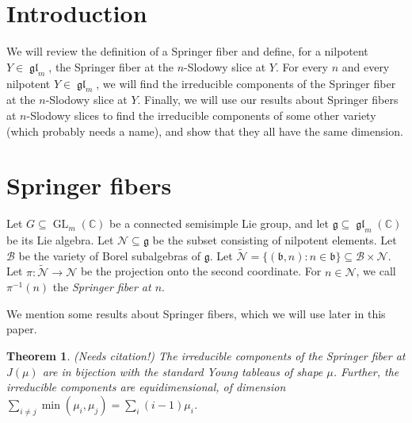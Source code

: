 \documentclass[12pt,psamsfonts]{article}
\DeclareMathOperator{\GL}{GL}
\DeclareMathOperator{\gl}{\mathfrak{gl}}
\newtheorem{theorem}{Theorem}[section]
\begin{document}

\section{Introduction}
We will review the definition of a Springer fiber and define, for a nilpotent \(Y \in \gl_m\), the Springer fiber at the \(n\)-Slodowy slice at \(Y\).
For every \(n\) and every nilpotent \(Y \in \gl_m\), we will find the irreducible components of the Springer fiber at the \(n\)-Slodowy slice at \(Y\).
Finally, we will use our results about Springer fibers at \(n\)-Slodowy slices to find the irreducible components of some other variety (which probably needs a name), and show that they all have the same dimension.

\section{Springer fibers}
Let \(G \subseteq \GL_m(\mathbb{C})\) be a connected semisimple Lie group, and let \(\mathfrak{g} \subseteq \gl_m(\mathbb{C})\) be its Lie algebra.
Let \(\mathcal{N} \subseteq \mathfrak{g}\) be the subset consisting of nilpotent elements.
Let \(\mathcal{B}\) be the variety of Borel subalgebras of \(\mathfrak{g}\).
Let \(\widetilde{\mathcal{N}} = \{(\mathfrak{b}, n) : n \in \mathfrak{b}\} \subseteq \mathcal{B} \times \mathcal{N}\).
Let \(\pi : \widetilde{\mathcal{N}} \to \mathcal{N}\) be the projection onto the second coordinate.
For \(n \in \mathcal{N}\), we call \(\pi^{-1}(n)\) the \emph{Springer fiber at \(n\)}.
\par We mention some results about Springer fibers, which we will use later in this paper.
\begin{theorem}
    (Needs citation!)
    The irreducible components of the Springer fiber at \(J(\mu)\) are in bijection with the standard Young tableaus of shape \(\mu\).
    Further, the irreducible components are equidimensional, of dimension \(\sum_{i \neq j} \min(\mu_i, \mu_j) = \sum_i (i - 1) \mu_i\).
\end{theorem}
\end{document}
